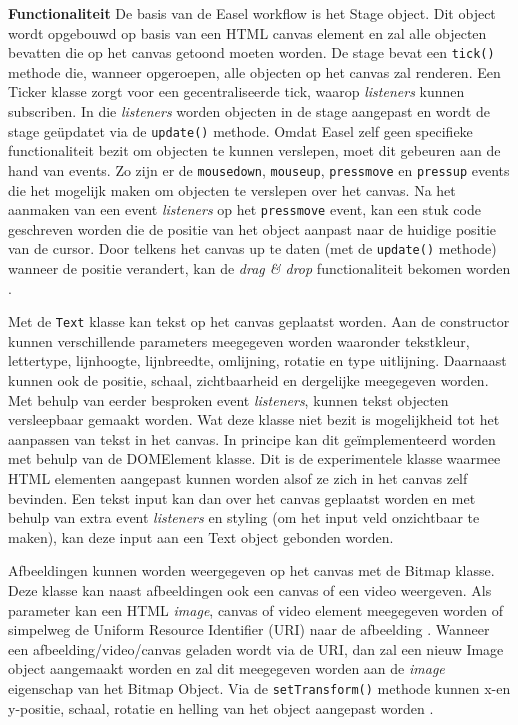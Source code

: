 \textbf{Functionaliteit} \break
De basis van de Easel workflow is het Stage object. Dit object wordt opgebouwd op basis van een HTML canvas element en zal alle objecten bevatten die op het canvas getoond moeten worden. De stage bevat een \texttt{tick()} methode die, wanneer opgeroepen, alle objecten op het canvas zal renderen. Een Ticker klasse zorgt voor een gecentraliseerde tick, waarop \textit{listeners} kunnen subscriben. In die \textit{listeners} worden objecten in de stage aangepast en wordt de stage ge\"{u}pdatet via de \texttt{update()} methode. Omdat Easel zelf geen specifieke functionaliteit bezit om objecten te kunnen verslepen, moet dit gebeuren aan de hand van events. Zo zijn er de \texttt{mousedown}, \texttt{mouseup}, \texttt{pressmove} en \texttt{pressup} events die het mogelijk maken om objecten te verslepen over het canvas. Na het aanmaken van een event \textit{listeners} op het \texttt{pressmove} event, kan een stuk code geschreven worden die de positie van het object aanpast naar de huidige positie van de cursor. Door telkens het canvas up te daten (met de \texttt{update()} methode) wanneer de positie verandert, kan de \textit{drag \& drop} functionaliteit bekomen worden \cite{EaselMouseInteraction}.  

Met de \texttt{Text} klasse kan tekst op het canvas geplaatst worden. Aan de constructor kunnen verschillende parameters meegegeven worden waaronder tekstkleur, lettertype, lijnhoogte, lijnbreedte, omlijning, rotatie en type uitlijning. Daarnaast kunnen ook de positie, schaal, zichtbaarheid en dergelijke meegegeven worden. Met behulp van eerder besproken event \textit{listeners}, kunnen tekst objecten versleepbaar gemaakt worden. Wat deze klasse niet bezit is mogelijkheid tot het aanpassen van tekst in het canvas. In principe kan dit ge\"{i}mplementeerd worden met behulp van de DOMElement klasse. Dit is de experimentele klasse waarmee HTML elementen aangepast kunnen worden alsof ze zich in het canvas zelf bevinden. Een tekst input kan dan over het canvas geplaatst worden en met behulp van extra event \textit{listeners} en styling (om het input veld onzichtbaar te maken), kan deze input aan een Text object gebonden worden. 

Afbeeldingen kunnen worden weergegeven op het canvas met de Bitmap klasse. Deze klasse kan naast afbeeldingen ook een canvas of een video weergeven. Als parameter kan een HTML \textit{image}, canvas of video element meegegeven worden of simpelweg de Uniform Resource Identifier (URI) naar de afbeelding \cite{URI}. Wanneer een afbeelding/video/canvas geladen wordt via de URI, dan zal een nieuw Image object aangemaakt worden en zal dit meegegeven worden aan de \textit{image} eigenschap van het Bitmap Object. Via de \texttt{setTransform()} methode kunnen x-en y-positie, schaal, rotatie en helling van het object aangepast worden \cite{EaselDocs}. 

